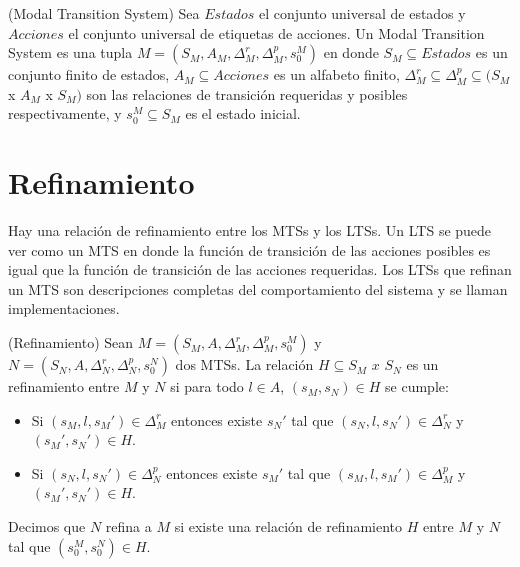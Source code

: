 \begin{definition}{(Modal Transition System)}
Sea $Estados$ el conjunto universal de estados y $Acciones$ el conjunto universal de etiquetas de acciones. Un Modal
Transition System es una tupla $M = (S_{M}, A_{M}, \Delta_{M}^{r}, \Delta_{M}^{p}, s_{0}^{M})$ en donde $S_{M} \subseteq Estados$
es un conjunto finito de estados, $A_{M} \subseteq Acciones$ es un alfabeto finito, 
$\Delta_{M}^{r} \subseteq \Delta_{M}^{p} \subseteq (S_{M}$ x $A_{M}$ x $S_{M})$ son las relaciones de transición requeridas
y posibles respectivamente, y $s_{0}^{M} \subseteq S_{M}$ es el estado inicial.
\end{definition}

\section{Refinamiento}
Hay una relación de refinamiento entre los MTSs y los LTSs. Un LTS se puede ver como un MTS en donde la función de
transición de las acciones posibles es igual que la función de transición de las acciones requeridas. Los LTSs que
refinan un MTS son descripciones completas del comportamiento del sistema y se llaman implementaciones.

\begin{definition}{(Refinamiento)}
Sean $M = (S_{M}, A, \Delta_{M}^{r}, \Delta_{M}^{p}, s_{0}^{M})$ y\\
$N = (S_{N}, A, \Delta_{N}^{r}, \Delta_{N}^{p}, s_{0}^{N})$ dos MTSs. La relación $H \subseteq S_{M}$ $x$ $S_{N}$ es un refinamiento
entre $M$ y $N$ si para todo $l \in A$, $(s_{M}, s_{N}) \in H$ se cumple:

\begin{itemize}

\item
Si $(s_{M}, l, s_{M}') \in \Delta_{M}^{r}$ entonces existe $s_{N}'$ tal que $(s_{N}, l, s_{N}') \in \Delta_{N}^{r}$ y $(s_{M}', s_{N}') \in H$.

\item
Si $(s_{N}, l, s_{N}') \in \Delta_{N}^{p}$ entonces existe $s_{M}'$ tal que $(s_{M}, l, s_{M}') \in \Delta_{M}^{p}$ y $(s_{M}', s_{N}') \in H$.

\end{itemize}

Decimos que $N$ refina a $M$ si existe una relación de refinamiento $H$ entre $M$ y $N$ tal que $(s_{0}^{M}, s_{0}^{N}) \in H$.

\end{definition}

